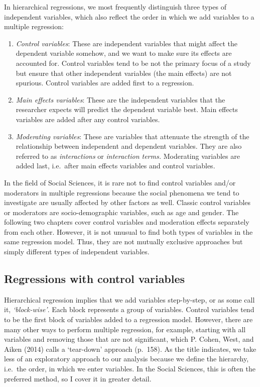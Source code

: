 \documentclass[
  letterpaper,
  DIV=11,
  numbers=noendperiod]{scrreprt}
\begin{document}
In hierarchical regressions, we most frequently distinguish three types
of independent variables, which also reflect the order in which we add
variables to a multiple regression:

\begin{enumerate}
\def\labelenumi{\arabic{enumi}.}
\item
  \emph{Control variables}: These are independent variables that might
  affect the dependent variable somehow, and we want to make sure its
  effects are accounted for. Control variables tend to be not the
  primary focus of a study but ensure that other independent variables
  (the main effects) are not spurious. Control variables are added first
  to a regression.
\item
  \emph{Main effects variables}: These are the independent variables
  that the researcher expects will predict the dependent variable best.
  Main effects variables are added after any control variables.
\item
  \emph{Moderating variables}: These are variables that attenuate the
  strength of the relationship between independent and dependent
  variables. They are also referred to as \emph{interactions} or
  \emph{interaction terms.} Moderating variables are added last,
  i.e.~after main effects variables and control variables.
\end{enumerate}

In the field of Social Sciences, it is rare not to find control
variables and/or moderators in multiple regressions because the social
phenomena we tend to investigate are usually affected by other factors
as well. Classic control variables or moderators are socio-demographic
variables, such as age and gender. The following two chapters cover
control variables and moderation effects separately from each other.
However, it is not unusual to find both types of variables in the same
regression model. Thus, they are not mutually exclusive approaches but
simply different types of independent variables.

\subsection{Regressions with control
variables}\label{sec-regressions-with-control-variables}

Hierarchical regression implies that we add variables step-by-step, or
as some call it, \emph{`block-wise'}. Each block represents a group of
variables. Control variables tend to be the first block of variables
added to a regression model. However, there are many other ways to
perform multiple regression, for example, starting with all variables
and removing those that are not significant, which P. Cohen, West, and
Aiken (2014) calls a `tear-down' approach (p.~158). As the title
indicates, we take less of an exploratory approach to our analysis
because we define the hierarchy, i.e.~the order, in which we enter
variables. In the Social Sciences, this is often the preferred method,
so I cover it in greater detail.
\end{document}
